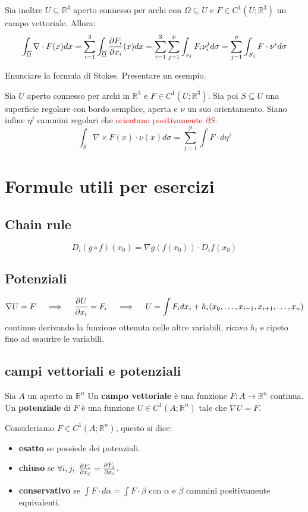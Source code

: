 \documentclass{exam}
\newcommand{\R}[0]{\mathbb{R}}
\newcommand{\err}[1]{\textcolor{red}{#1}}
\begin{document}
\begin{questions}
\begin{solution}
    Sia inoltre $U\subseteq \R^3$ aperto connesso per archi con $\Omega \subseteq U$ e $F \in C^1(U; \R^3)$ un campo vettoriale. Allora:
    \[ 
    \int_{\overline{\Omega}} \nabla \cdot F(x) dx = \sum_{i=1}^3 \int_{\overline{\Omega}} \pdv{F_i}{x_i} (x) dx = \sum_{i=1}^3 \sum_{j=1}^p \int_{s_j}F_i \nu^j_i d \sigma = \sum_{j=1}^p \int_{S_j} F \cdot \nu^i d\sigma
    \]
\end{solution}
\question Enunciare la formula di Stokes. Presentare un esempio.
\begin{solution}
    Sia $U$ aperto connesso per archi in $\R^3$ e $F\in C^1(U;\R^3)$.
    Sia poi $S \subseteq U$ una superficie regolare con bordo semplice, aperta e $\nu$ un suo orientamento.
    Siano infine $\eta^j$ cammini regolari che \err{orientano positivamente $\partial S$}.
    \[
    \int_S \nabla \times F (x)\cdot\nu(x)  d\sigma = \sum_{j=1}^p \int F \cdot d\eta^j 
    \]
\end{solution}    
\end{questions}

\appendix
\section*{Formule utili per esercizi}
\subsection*{Chain rule}
\[
D_i(g \circ f) (x_0) = \nabla g(f(x_0)) \cdot D_i f(x_0)
\]

\subsection*{Potenziali}
\[
\nabla U = F \quad \implies \quad \pdv{U}{x_i} = F_i \quad \implies \quad U = \int F_i dx_i + h_i(x_0, \dots, x_{i-1}, x_{i+1}, \dots, x_n)
\]
continuo derivando la funzione ottenuta nelle altre variabili, ricavo $h_i$ e ripeto fino ad esaurire le variabili.

\subsection*{campi vettoriali e potenziali}
Sia $A$ un aperto in $\R^n$
Un \textbf{campo vettoriale} è una funzione $F: A \to \R^n$ continua.
Un \textbf{potenziale} di $F$ è una funzione $U \in C^1(A; \R^n)$ tale che $\nabla U = F$.


Consideriamo $F \in C^1(A;\R^n)$, questo si dice:
\begin{itemize}
    \item \textbf{esatto} se possiede dei potenziali.
    \item \textbf{chiuso} se $\forall i,j, \ \pdv{F_i}{x_j} = \pdv{F_j}{x_i}$.
    \item \textbf{conservativo} se $ \int F \cdot d\alpha = \int F \cdot \beta$ con $\alpha$ e $\beta$ cammini positivamente equivalenti.
\end{itemize}
\end{document}
